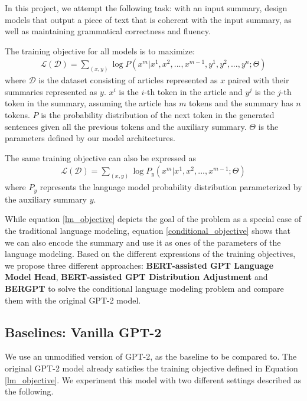 \documentclass{article}
\begin{document}
In this project, we attempt the following task: with an input summary, design models that output a piece of text that is coherent with the input summary, as well as maintaining grammatical correctness and fluency.

The training objective for all models is to maximize:
\begin{align}
    \mathcal{L}(\mathcal{D}) = \sum_{(x,y)} \log P(x^m|x^1, x^2, ..., x^{m-1}, y^1, y^2, ..., y^n; \Theta)
    \label{lm_objective}
\end{align}
where $\mathcal{D}$ is the dataset consisting of articles represented as $x$ paired with their summaries represented as $y$. $x^i$ is the $i$-th token in the article and $y^j$ is the $j$-th token in the summary, assuming the article has $m$ tokens and the summary has $n$ tokens. $P$ is the probability distribution of the next token in the generated sentences given all the previous tokens and the auxiliary summary. $\Theta$ is the parameters defined by our model architectures.

The same training objective can also be expressed as
\begin{align}
    \mathcal{L}(\mathcal{D}) = \sum_{(x,y)} \log P_y(x^m|x^1, x^2, ..., x^{m-1}; \Theta)
    \label{conditional_objective}
\end{align}
where $P_y$ represents the language model probability distribution parameterized by the auxiliary summary $y$.

While equation \ref{lm_objective} depicts the goal of the problem as a special case of the traditional language modeling, equation \ref{conditional_objective} shows that we can also encode the summary and use it as ones of the parameters of the language modeling. Based on the different expressions of the training objectives, we propose three different approaches: \textbf{BERT-assisted GPT Language Model Head}, \textbf{BERT-assisted GPT Distribution Adjustment} and \textbf{BERGPT} to solve the conditional language modeling problem and compare them with the original GPT-2 model.

\subsection{Baselines: Vanilla GPT-2}

We use an unmodified version of GPT-2, as the baseline to be compared to. The original GPT-2 model already satisfies the training objective defined in Equation \ref{lm_objective}. We experiment this model with two different settings described as the following.
\end{document}
